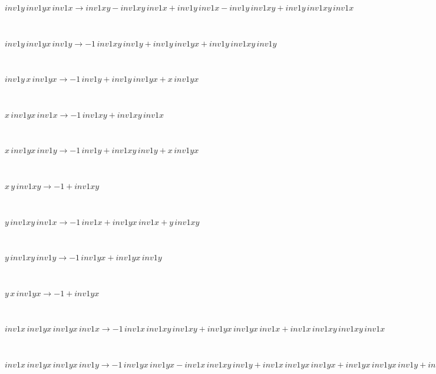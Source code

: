 \begin{minipage}{6in}
$
inv1y\,
 inv1yx\,
 inv1x\rightarrow inv1xy - inv1xy\,
 inv1x + inv1y\,
 inv1x - inv1y\,
 inv1xy + inv1y\,
 inv1xy\,
 inv1x
$
\end{minipage}\medskip \\
\begin{minipage}{6in}
$
inv1y\,
 inv1yx\,
 inv1y\rightarrow -1\,
 inv1xy\,
 inv1y + inv1y\,
 inv1yx + inv1y\,
 inv1xy\,
 inv1y
$
\end{minipage}\medskip \\
\begin{minipage}{6in}
$
inv1y\,
 x\,
 inv1yx\rightarrow -1\,
 inv1y + inv1y\,
 inv1yx + x\,
 inv1yx
$
\end{minipage}\medskip \\
\begin{minipage}{6in}
$
x\,
 inv1yx\,
 inv1x\rightarrow -1\,
 inv1xy + inv1xy\,
 inv1x
$
\end{minipage}\medskip \\
\begin{minipage}{6in}
$
x\,
 inv1yx\,
 inv1y\rightarrow -1\,
 inv1y + inv1xy\,
 inv1y + x\,
 inv1yx
$
\end{minipage}\medskip \\
\begin{minipage}{6in}
$
x\,
 y\,
 inv1xy\rightarrow -1 + inv1xy
$
\end{minipage}\medskip \\
\begin{minipage}{6in}
$
y\,
 inv1xy\,
 inv1x\rightarrow -1\,
 inv1x + inv1yx\,
 inv1x + y\,
 inv1xy
$
\end{minipage}\medskip \\
\begin{minipage}{6in}
$
y\,
 inv1xy\,
 inv1y\rightarrow -1\,
 inv1yx + inv1yx\,
 inv1y
$
\end{minipage}\medskip \\
\begin{minipage}{6in}
$
y\,
 x\,
 inv1yx\rightarrow -1 + inv1yx
$
\end{minipage}\medskip \\
\begin{minipage}{6in}
$
inv1x\,
 inv1yx\,
 inv1yx\,
 inv1x\rightarrow -1\,
 inv1x\,
 inv1xy\,
 inv1xy + inv1yx\,
 inv1yx\,
 inv1x + inv1x\,
 inv1xy\,
 inv1xy\,
 inv1x
$
\end{minipage}\medskip \\
\begin{minipage}{6in}
$
inv1x\,
 inv1yx\,
 inv1yx\,
 inv1y\rightarrow -1\,
 inv1yx\,
 inv1yx - inv1x\,
 inv1xy\,
 inv1y + inv1x\,
 inv1yx\,
 inv1yx + inv1yx\,
 inv1yx\,
 inv1y + inv1x\,
 inv1xy\,
 inv1xy\,
 inv1y
$
\end{minipage}\medskip \\
